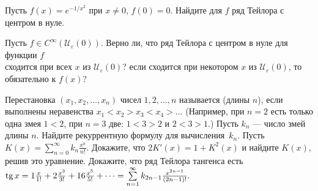 \documentclass[a4paper, 11pt]{article}
\newcommand{\0}[1]{\overline{#1}}
\def\U{{\mathcal U}}
\begin{document}
Пусть $f(x)=e^{-1/x^2}$ при $x\ne0$, $f(0)=0$.
Найдите для $f$ %
ряд Тейлора с центром в нуле.

Пусть $f\in C^{\infty}(\U_\varepsilon(0))$.
Верно ли, что ряд Тейлора с центром в нуле для функции $f$\\
сходится при всех $x$ из $\U_\varepsilon(0)$?
если сходится при некотором $x$ из $\U_\varepsilon(0)$,
то обязательно к $f(x)$?

Перестановка $(x_1,x_2,\dots,x_n)$ чисел $1,2,\dots,n$ называется
 (длины $n$), если выполнены неравенства
$x_1<x_2>x_3<x_4>\dots$ (Например,
при $n=2$ есть только одна змея $1<2$, при $n=3$ две:
$1<3>2$ и $2<3>1$.)
Пусть $k_n$ --- число змей длины $n$.
 Найдите рекуррентную формулу для вычисления~$k_n$.
 Пусть $K(x)=\sum\limits_{n=0}^{\infty}k_{n}\frac{x^{n}}{n!}$.
Докажите, что $2K'(x)=1+K^2(x)$ и найдите $K(x)$, решив это
уравнение.
Докажите, что ряд Тейлора тангенса есть
$
\tg x=1\frac{x}{1!}+2\frac{x^3}{3!}+16\frac{x^5}{5!}+\dots=
\sum\limits_{n=1}^{\infty}k_{2n-1}\frac{x^{2n-1}}{(2n-1)!}.
$






\end{document}
